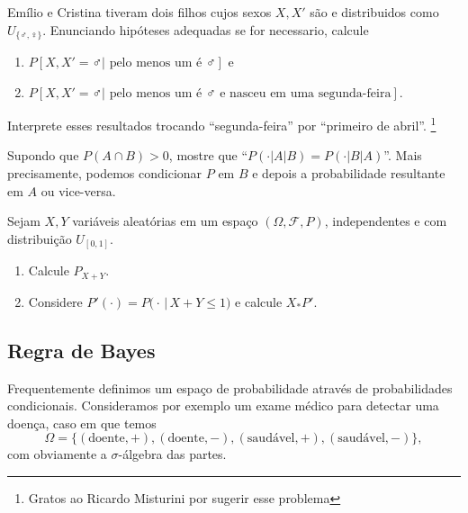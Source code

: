 \begin{exercise}
  Emílio e Cristina tiveram dois filhos cujos sexos $X, X'$ são \iid e distribuidos como $U_{\{\male, \female\}}$.
Enunciando hipóteses adequadas se for necessario,  calcule
  \begin{enumerate}[\quad a)]
  \item $P[X, X' = \male | \text{ pelo menos um é $\male$}]$ e
  \item $P[X, X' = \male | \text{ pelo menos um é $\male$ e nasceu em uma segunda-feira}]$.
  \end{enumerate}
  Interprete esses resultados trocando ``segunda-feira'' por ``primeiro de abril''.
  \footnote{Gratos ao Ricardo Misturini por sugerir esse problema}
\end{exercise}

\begin{exercise}
  Supondo que $P(A \cap B) > 0$, mostre que ``$P(\cdot|A|B) = P(\cdot|B|A)$''.
  Mais precisamente, podemos condicionar $P$ em $B$ e depois a probabilidade resultante em $A$ ou vice-versa.
\end{exercise}

\begin{exercise}
  Sejam $X, Y$ vari\'aveis aleat\'orias em um espaço $(\Omega, \mathcal{F}, P)$, independentes e com distribuição $U_{[0,1]}$.
  \begin{enumerate}[\quad a)]
  \item Calcule $ P_{X+Y}$.
  \item Considere $P'(\cdot) = P\big(\cdot \, | \, X + Y \leq 1 \big)$ e calcule $X_* P'$.
  \end{enumerate}
\end{exercise}


\subsection{Regra de Bayes}

Frequentemente definimos um espaço de probabilidade através de probabilidades condicionais.
Consideramos por exemplo um exame médico para detectar uma doença, caso em que temos
\begin{equation}
  \Omega = \{(\text{doente}, +), (\text{doente}, -), (\text{saudável}, +), (\text{saudável}, -)\},
\end{equation}
com obviamente a $\sigma$-álgebra das partes.

